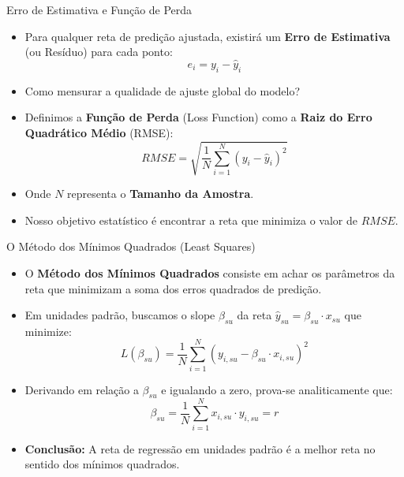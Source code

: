 \begin{frame}{Erro de Estimativa e Função de Perda}
    \begin{itemize}
        \item Para qualquer reta de predição ajustada, existirá um \textbf{Erro de Estimativa} (ou Resíduo) para cada ponto:
        $$e_i = y_i - \hat{y}_i$$
        \item Como mensurar a qualidade de ajuste global do modelo?
        \item Definimos a \textbf{Função de Perda} (Loss Function) como a \textbf{Raiz do Erro Quadrático Médio} (RMSE):
        $$RMSE = \sqrt{\frac{1}{N} \sum_{i=1}^N (y_i - \hat{y}_i)^2}$$
        \item Onde $N$ representa o \textbf{Tamanho da Amostra}.
        \item Nosso objetivo estatístico é encontrar a reta que minimiza o valor de $RMSE$.
    \end{itemize}
\end{frame}

\begin{frame}{O Método dos Mínimos Quadrados (Least Squares)}
    \begin{itemize}
        \item O \textbf{Método dos Mínimos Quadrados} consiste em achar os parâmetros da reta que minimizam a soma dos erros quadrados de predição.
        \item Em unidades padrão, buscamos o slope $\beta_{su}$ da reta $\hat{y}_{su} = \beta_{su} \cdot x_{su}$ que minimize:
        $$L(\beta_{su}) = \frac{1}{N} \sum_{i=1}^N (y_{i,su} - \beta_{su} \cdot x_{i,su})^2$$
        \item Derivando em relação a $\beta_{su}$ e igualando a zero, prova-se analiticamente que:
        $$\beta_{su} = \frac{1}{N} \sum_{i=1}^N x_{i,su} \cdot y_{i,su} = r$$
        \item \textbf{Conclusão:} A reta de regressão em unidades padrão é a melhor reta no sentido dos mínimos quadrados.
    \end{itemize}
\end{frame}

